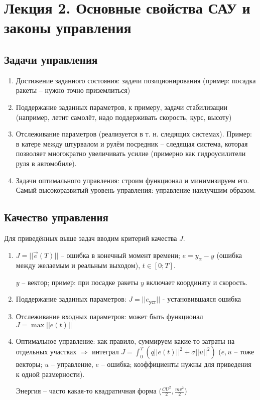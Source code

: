 \documentclass[main.tex]{subfiles}
\begin{document}
\section{ Лекция 2. Основные свойства САУ и законы управления }

\subsection{ Задачи управления }

\begin{enumerate}
	\item Достижение заданного состояния: задачи позиционирования (пример: посадка ракеты -- нужно точно приземлиться)
	\item Поддержание заданных параметров, к примеру, задачи стабилизации (например, летит самолёт, надо поддерживать скорость, курс, высоту)
	\item Отслеживание параметров (реализуется в т. н. следящих системах).
	Пример: в катере между штурвалом и рулём посредник -- следящая система, которая позволяет многократно увеличивать усилие (примерно как гидроусилители руля в автомобиле).
	\item Задачи оптимального управления: строим функционал и минимизируем его. Самый высокоразвитый уровень управления: управление наилучшим образом.
\end{enumerate}

\subsection{Качество управления}

Для приведённых выше задач вводим критерий качества $ J $.

\begin{enumerate}[noitemsep]
	\item $J= ||\vec e(T)|| $ -- ошибка в конечный момент времени; $ e = y_\alpha - y $ (ошибка между желаемым и реальным выходом), $ t \in [0;T] $.

    $ y $ -- вектор; пример: при посадке ракеты $ y $ включает координату и скорость.
	\item Поддержание заданных параметров: $ J =||e_{\text{уст}}|| $ - установившаяся ошибка
	\item Отслеживание входных параметров: может быть функционал $ J = \max || e(t) || $
	\item Оптимальное управление: как правило, суммируем какие-то затраты на отдельных участках $ \Rightarrow $ интеграл $ J = \int_{0}^{T}(q ||e(t)||^2 +  \sigma||u||^2)$ ($ e, u $ -- тоже векторы; $ u $ --  управление, $ e $ -- ошибка;  коэффициенты нужны для приведения к одной размерности).

    Энергия -- часто какая-то квадратичная форма ($ \frac{CU^2}{2}, \frac{mv^2}{2} $)
\end{enumerate}
\end{document}
